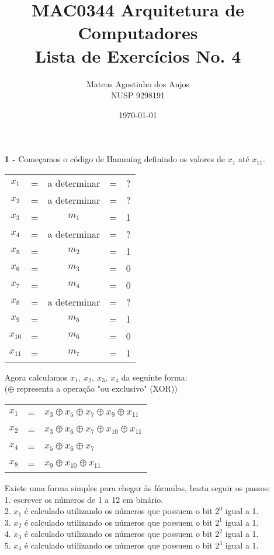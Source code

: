 \documentclass[12pt]{article}
\title{MAC0344 Arquitetura de Computadores\\
Lista de Exercícios No. 4
}
\author{Mateus Agostinho dos Anjos\\NUSP 9298191}
\date{\today}
\begin{document}
	\maketitle
	\begin{itemize}
		\item[\textbf{1 -}]
			\hfill\newline
			Começamos o código de Hamming definindo os valores de $x_1$ até $x_{11}$.
			\begin{center}
				\begin{tabular}{ccccc}
					$x_1$ & = & a determinar & = & ?\\
					$x_2$ & = & a determinar& = & ?\\
					$x_3$ & = & $m_1$ & = & 1 \\
					$x_4$ & = & a determinar & = & ?\\
					$x_5$ & = & $m_2$ & = & 1\\
					$x_6$ & = & $m_3$ & = & 0\\
					$x_7$ & = & $m_4$ & = & 0\\
					$x_8$ & = & a determinar & = & ?\\
					$x_9$ & = & $m_5$ & = & 1\\
					$x_{10}$ & = & $m_6$ & = & 0\\
					$x_{11}$ & = & $m_7$ & =& 1\\
				\end{tabular}
			\end{center}
			Agora calculamos $x_1, \ x_2, \ x_3, \ x_4$ da seguinte forma:\\
			($\oplus$ representa a operação "ou exclusivo" (XOR))
			\begin{center}
				\begin{tabular}{ccl}
					$x_1$ & = & $x_3 \oplus x_5 \oplus x_7 \oplus x_9 \oplus x_{11}$\\
					$x_2$ & = & $x_3 \oplus x_6 \oplus x_7 \oplus x_{10} \oplus x_{11}$\\
					$x_4$ & = & $x_5 \oplus x_6 \oplus x_7$\\
					$x_8$ & = & $x_9 \oplus x_{10} \oplus x_{11}$\\
				\end{tabular}
			\end{center}
			\newpage
			Existe uma forma simples para chegar às fórmulas, basta seguir os passos:\\
			1. escrever os números de 1 a 12 em binário.\\
			2. $x_1$ é calculado utilizando os números que possuem o bit $2^0$ igual a 1.\\
			3. $x_2$ é calculado utilizando os números que possuem o bit $2^1$ igual a 1.\\
			4. $x_3$ é calculado utilizando os números que possuem o bit $2^2$ igual a 1.\\
			5. $x_4$ é calculado utilizando os números que possuem o bit $2^3$ igual a 1.\\
			

\end{itemize}
\end{document}
